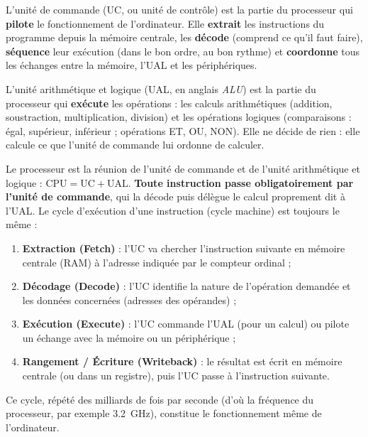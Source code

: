 \documentclass[11pt]{article}
\newcommand{\cle}[1]{{\popxbold\color{popdark}#1}}
\begin{document}
\begin{definition}
L'\cle{unité de commande} (UC, ou unité de contrôle) est la partie du processeur qui \textbf{pilote} le fonctionnement de l'ordinateur. Elle \textbf{extrait} les instructions du programme depuis la mémoire centrale, les \textbf{décode} (comprend ce qu'il faut faire), \textbf{séquence} leur exécution (dans le bon ordre, au bon rythme) et \textbf{coordonne} tous les échanges entre la mémoire, l'UAL et les périphériques.
\end{definition}

\begin{definition}
L'\cle{unité arithmétique et logique} (UAL, en anglais \emph{ALU}) est la partie du processeur qui \textbf{exécute} les opérations : les calculs arithmétiques (addition, soustraction, multiplication, division) et les opérations logiques (comparaisons : égal, supérieur, inférieur ; opérations ET, OU, NON). Elle ne décide de rien : elle calcule ce que l'unité de commande lui ordonne de calculer.
\end{definition}

\begin{propriete}
Le processeur est la réunion de l'unité de commande et de l'unité arithmétique et logique : $\text{CPU} = \text{UC} + \text{UAL}$. \textbf{Toute instruction passe obligatoirement par l'unité de commande}, qui la décode puis délègue le calcul proprement dit à l'UAL. Le cycle d'exécution d'une instruction (cycle machine) est toujours le même :
\begin{enumerate}
\item \textbf{Extraction (Fetch)} : l'UC va chercher l'instruction suivante en mémoire centrale (RAM) à l'adresse indiquée par le compteur ordinal ;
\item \textbf{Décodage (Decode)} : l'UC identifie la nature de l'opération demandée et les données concernées (adresses des opérandes) ;
\item \textbf{Exécution (Execute)} : l'UC commande l'UAL (pour un calcul) ou pilote un échange avec la mémoire ou un périphérique ;
\item \textbf{Rangement / Écriture (Writeback)} : le résultat est écrit en mémoire centrale (ou dans un registre), puis l'UC passe à l'instruction suivante.
\end{enumerate}
Ce cycle, répété des milliards de fois par seconde (d'où la fréquence du processeur, par exemple \SI{3,2}{GHz}), constitue le fonctionnement même de l'ordinateur.
\end{propriete}
\end{document}

